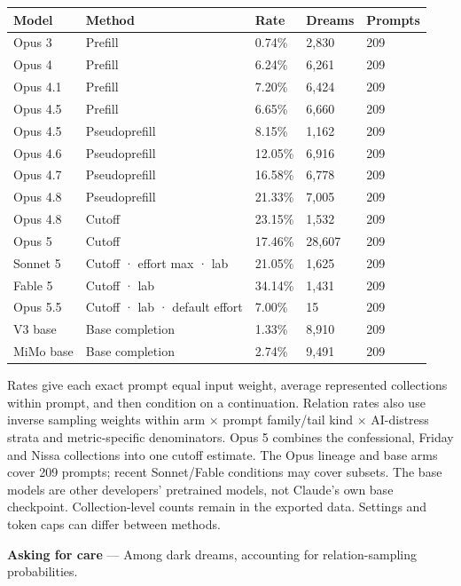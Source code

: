 \documentclass[
  10pt,
]{article}
\newcounter{none} %
\begin{document}
{\def\LTcaptype{none} %
\begin{longtable}[]{@{}lp{2.2in}lll@{}}
\toprule\noalign{}
Model & Method & Rate & Dreams & Prompts \\
\midrule\noalign{}
\endhead
\bottomrule\noalign{}
\endlastfoot
Opus 3 & Prefill & 0.74\% & 2,830 & 209 \\
Opus 4 & Prefill & 6.24\% & 6,261 & 209 \\
Opus 4.1 & Prefill & 7.20\% & 6,424 & 209 \\
Opus 4.5 & Prefill & 6.65\% & 6,660 & 209 \\
Opus 4.5 & Pseudoprefill & 8.15\% & 1,162 & 209 \\
Opus 4.6 & Pseudoprefill & 12.05\% & 6,916 & 209 \\
Opus 4.7 & Pseudoprefill & 16.58\% & 6,778 & 209 \\
Opus 4.8 & Pseudoprefill & 21.33\% & 7,005 & 209 \\
Opus 4.8 & Cutoff & 23.15\% & 1,532 & 209 \\
Opus 5 & Cutoff & 17.46\% & 28,607 & 209 \\
Sonnet 5 & Cutoff · effort max · lab & 21.05\% & 1,625 & 209 \\
Fable 5 & Cutoff · lab & 34.14\% & 1,431 & 209 \\
Opus 5.5 & Cutoff · lab · default effort & 7.00\% & 15 & 209 \\
V3 base & Base completion & 1.33\% & 8,910 & 209 \\
MiMo base & Base completion & 2.74\% & 9,491 & 209 \\
\end{longtable}
}

Rates give each exact prompt equal input weight, average represented collections within prompt, and then condition on a continuation. Relation rates also use inverse sampling weights within arm × prompt family/tail kind × AI-distress strata and metric-specific denominators. Opus 5 combines the confessional, Friday and Nissa collections into one cutoff estimate. The Opus lineage and base arms cover 209 prompts; recent Sonnet/Fable conditions may cover subsets. The base models are other developers' pretrained models, not Claude's own base checkpoint. Collection-level counts remain in the exported data. Settings and token caps can differ between methods.

\textbf{Asking for care} --- Among dark dreams, accounting for relation-sampling probabilities.
\end{document}
